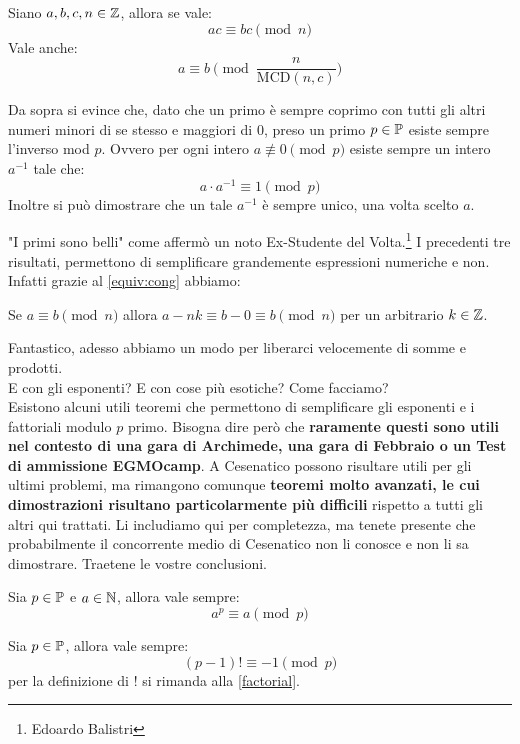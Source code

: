 \documentclass[11pt]{scrartcl}
\begin{document}
	\begin{lemma}
		Siano $a,b,c,n\in \mathbb Z$, allora se vale:
		$$ac\equiv bc \pmod{n}$$
		Vale anche:
		$$a \equiv b \pmod{\frac{n}{\text{MCD}(n,c)}}$$
	\end{lemma}
	\begin{corollary}
		Da sopra si evince che, dato che un primo è sempre coprimo con tutti gli altri numeri minori di se stesso e maggiori di $0$, preso un primo $p\in \mathbb P$ esiste sempre l'inverso mod $p$. Ovvero per ogni intero $a \not \equiv 0 \pmod{p}$ esiste sempre un intero $a^{-1}$ tale che:
		$$a\cdot a^{-1} \equiv 1 \pmod{p}$$
		Inoltre si può dimostrare che un tale $a^{-1}$ è sempre unico, una volta scelto $a$.
	\end{corollary}
	"I primi sono belli" come affermò un noto Ex-Studente del Volta.\footnote{Edoardo Balistri}
	I precedenti tre risultati, permettono di semplificare grandemente espressioni numeriche e non. Infatti grazie al \cref{equiv:cong} abbiamo:
	\begin{fact}
		
		Se $a \equiv b \pmod{n}$ allora $a-nk \equiv b-0 \equiv b \pmod{n}$ per un arbitrario $k \in \mathbb Z$.
	\end{fact}
	Fantastico, adesso abbiamo un modo per liberarci velocemente di somme e prodotti.\\
	E con gli esponenti? E con cose più esotiche? Come facciamo?\\
	Esistono alcuni utili teoremi che permettono di semplificare gli esponenti e i fattoriali modulo $p$ primo. Bisogna dire però che \textbf{raramente questi sono utili nel contesto di una gara di Archimede, una gara di Febbraio o un Test di ammissione EGMOcamp}. A Cesenatico possono risultare utili per gli ultimi problemi, ma rimangono comunque \textbf{teoremi molto avanzati, le cui dimostrazioni risultano particolarmente più difficili} rispetto a tutti gli altri qui trattati. Li includiamo qui per completezza, ma tenete presente che probabilmente il concorrente medio di Cesenatico non li conosce e non li sa dimostrare. Traetene le vostre conclusioni.
	\begin{theorem}
		Sia $p\in\mathbb P$ e $a\in\mathbb N$, allora vale sempre:
		$$a^p \equiv a \pmod{p}$$
	\end{theorem}
	\begin{theorem}[Wilson]
		Sia $p\in\mathbb P$, allora vale sempre:
		$$(p-1)! \equiv -1 \pmod{p}$$
		per la definizione di $!$ si rimanda alla \cref{factorial}.
	\end{theorem}
\end{document}
